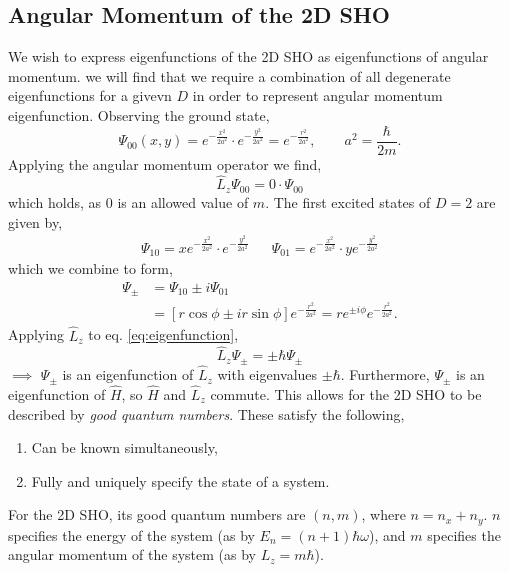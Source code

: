\documentclass{book}
\begin{document}
\subsection{Angular Momentum of the 2D SHO}
We wish to express eigenfunctions of the 2D SHO as eigenfunctions of angular momentum. we will find that we require a combination of all degenerate eigenfunctions for a givevn $D$ in order to represent angular momentum eigenfunction. Observing the ground state,
\begin{equation}
	\Psi_{00}(x,y) = e^{-\frac{x^2}{2a^2}}\cdot e^{-\frac{y^2}{2a^2}} = e^{-\frac{r^2}{2a^2}}, \hspace{2em} a^2 = \frac{\hbar}{2m}.
\end{equation}
Applying the angular momentum operator we find,
\begin{equation}
	\hat{L}_z\Psi_{00} = 0 \cdot \Psi_{00}
\end{equation}
which holds, as $0$ is an allowed value of $m$. The first excited states of $D=2$ are given by,
\begin{align}
	\Psi_{10} = x e^{-\frac{x^2}{2a^2}} \cdot e^{-\frac{y^2}{2a^2}} && \Psi_{01} = e^{-\frac{x^2}{2a^2}} \cdot ye^{-\frac{y^2}{2a^2}}
\end{align}
which we combine to form,
\begin{equation}
	\begin{split}
	\Psi_{\pm} &= \Psi_{10} \pm i\Psi_{01} \\
	& = \left[r\cos\phi \pm ir\sin\phi\right]e^{-\frac{r^2}{2a^2}} = re^{\pm i\phi}e^{-\frac{r^2}{2a^2}}. \label{eq:eigenfunction}
	\end{split}
\end{equation}
Applying $\hat{L}_z$ to eq. \eqref{eq:eigenfunction},
\begin{equation}
	\hat{L}_z\Psi_{\pm} = \pm \hbar \Psi_{\pm}
\end{equation}
$\implies$ $\Psi_{\pm}$ is an eigenfunction of $\hat{L}_z$ with eigenvalues $\pm \hbar$. Furthermore, $\Psi_{\pm}$ is an eigenfunction of $\hat{H}$, so $\hat{H}$ and $\hat{L}_z$ commute. This allows for the 2D SHO to be described by \textit{good quantum numbers}. These satisfy the following,
\begin{enumerate}
	\item Can be known simultaneously,
	\item Fully and uniquely specify the state of a system.
\end{enumerate}
For the 2D SHO, its good quantum numbers are $(n,m)$, where $n = n_x + n_y$. $n$ specifies the energy of the system (as by $E_n = (n + 1)\hbar \omega$), and $m$ specifies the angular momentum of the system (as by $L_z = m\hbar$).
\end{document}

